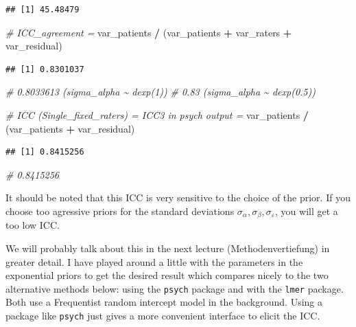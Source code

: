 \documentclass[
]{book}
\newenvironment{Shaded}{\begin{snugshade}}{\end{snugshade}}
\newcommand{\CommentTok}[1]{\textcolor[rgb]{0.56,0.35,0.01}{\textit{#1}}}
\newcommand{\NormalTok}[1]{#1}
\newcommand{\SpecialCharTok}[1]{\textcolor[rgb]{0.81,0.36,0.00}{\textbf{#1}}}
\begin{document}
\begin{verbatim}
## [1] 45.48479
\end{verbatim}

\begin{Shaded}
\begin{Highlighting}[]
\CommentTok{\# ICC\_agreement = }
\NormalTok{var\_patients }\SpecialCharTok{/}\NormalTok{ (var\_patients }\SpecialCharTok{+}\NormalTok{ var\_raters }\SpecialCharTok{+}\NormalTok{ var\_residual)}
\end{Highlighting}
\end{Shaded}

\begin{verbatim}
## [1] 0.8301037
\end{verbatim}

\begin{Shaded}
\begin{Highlighting}[]
\CommentTok{\# 0.8033613 (sigma\_alpha \textasciitilde{} dexp(1))}
\CommentTok{\# 0.83 (sigma\_alpha \textasciitilde{} dexp(0.5))}

\CommentTok{\# ICC (Single\_fixed\_raters) = ICC3 in psych output = }
\NormalTok{var\_patients }\SpecialCharTok{/}\NormalTok{ (var\_patients }\SpecialCharTok{+}\NormalTok{ var\_residual)}
\end{Highlighting}
\end{Shaded}

\begin{verbatim}
## [1] 0.8415256
\end{verbatim}

\begin{Shaded}
\begin{Highlighting}[]
\CommentTok{\# 0.8415256}
\end{Highlighting}
\end{Shaded}

It should be noted that this ICC is very sensitive to the choice of the prior.
If you choose too agressive priors for the standard deviations \(\sigma_{\alpha},
\sigma_{\beta}, \sigma_{\varepsilon}\), you will get a too low ICC.

We will probably talk about this in the next lecture (Methodenvertiefung) in greater detail.
I have played around a little with the parameters in the exponential priors
to get the desired result which compares nicely to the two alternative methods below:
using the \texttt{psych} package and with the \texttt{lmer}
package. Both use a Frequentist random intercept model in the background.
Using a package like \texttt{psych} just gives a more convenient interface to
elicit the ICC.
\end{document}
